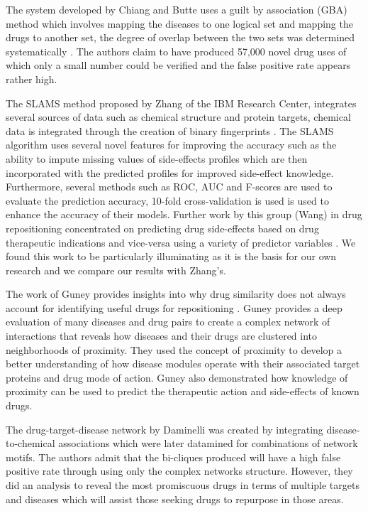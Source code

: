 \documentclass[preprint,12pt]{elsarticle}
\begin{document}
The system developed by Chiang and Butte uses a guilt by association (GBA) method which involves mapping the diseases to one logical set and mapping the drugs to another set, the degree of overlap between the two sets was determined systematically  \cite{Chiang2009}. The authors claim to have produced 57,000 novel drug uses of which only a small number could be verified and the false positive rate appears rather high. 

The SLAMS method proposed by Zhang of the IBM Research Center, integrates several sources of data such as chemical structure and protein targets, chemical data is integrated through the creation of binary fingerprints \cite{Zhang2013,Zhang2014}. The SLAMS algorithm uses several novel features for improving the accuracy such as the ability to impute missing values of side-effects profiles which are then incorporated with the predicted profiles for improved side-effect knowledge. Furthermore, several methods such as ROC, AUC and F-scores are used to evaluate the prediction accuracy, 10-fold cross-validation is used is used to enhance the accuracy of their models. Further work by this group (Wang) in drug repositioning concentrated on predicting drug side-effects based on drug therapeutic indications and vice-versa using a variety of predictor variables \cite{FWang2014}. We found this work to be particularly illuminating as it is the basis for our own research and we compare our results with Zhang's. 

The work of Guney provides insights into why drug similarity does not always account for identifying useful drugs for repositioning \cite{Guney2016a,Guney2017}. Guney provides a deep evaluation of many diseases and drug pairs to create a complex network of interactions that reveals how diseases and their drugs are clustered into neighborhoods of proximity. They used the concept of proximity to develop a better understanding of how disease  modules operate with their associated target proteins and drug mode of action. Guney also demonstrated how knowledge of  proximity can be used to predict the therapeutic action and side-effects of known drugs.

The drug-target-disease network by Daminelli \cite{Daminelli2012} was created by integrating disease-to-chemical associations which were later datamined for combinations of network motifs. The authors admit that the bi-cliques produced will have a high false positive rate through using only the complex networks structure. However, they did an analysis to reveal the most promiscuous drugs in terms of multiple targets and diseases which will assist those seeking drugs to repurpose in those areas.
 
\end{document}
